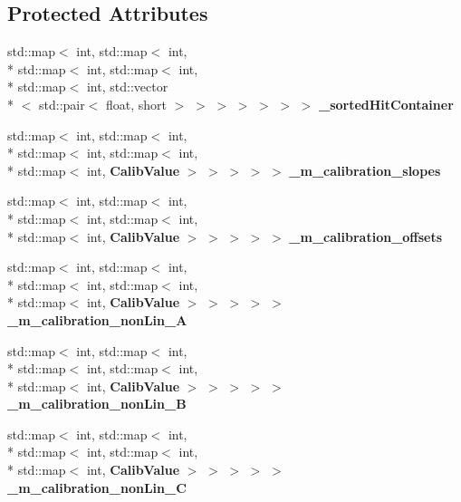 \subsection*{Protected Attributes}
\begin{DoxyCompactItemize}
\item 
std\-::map$<$ int, std\-::map$<$ int, \\*
std\-::map$<$ int, std\-::map$<$ int, \\*
std\-::map$<$ int, std\-::vector\\*
$<$ std\-::pair$<$ float, short $>$ $>$ $>$ $>$ $>$ $>$ $>$ {\bfseries \-\_\-sorted\-Hit\-Container}\label{classCALICE_1_1Ahc2TimeCalibrator_a4ad9a1a2332f58a2c3360f1b445f983b}

\item 
std\-::map$<$ int, std\-::map$<$ int, \\*
std\-::map$<$ int, std\-::map$<$ int, \\*
std\-::map$<$ int, {\bf Calib\-Value} $>$ $>$ $>$ $>$ $>$ {\bfseries \-\_\-m\-\_\-calibration\-\_\-slopes}\label{classCALICE_1_1Ahc2TimeCalibrator_a32d278ad093772556244b07621793fa0}

\item 
std\-::map$<$ int, std\-::map$<$ int, \\*
std\-::map$<$ int, std\-::map$<$ int, \\*
std\-::map$<$ int, {\bf Calib\-Value} $>$ $>$ $>$ $>$ $>$ {\bfseries \-\_\-m\-\_\-calibration\-\_\-offsets}\label{classCALICE_1_1Ahc2TimeCalibrator_a142b706b13a6463b3777ce834866da12}

\item 
std\-::map$<$ int, std\-::map$<$ int, \\*
std\-::map$<$ int, std\-::map$<$ int, \\*
std\-::map$<$ int, {\bf Calib\-Value} $>$ $>$ $>$ $>$ $>$ {\bfseries \-\_\-m\-\_\-calibration\-\_\-non\-Lin\-\_\-\-A}\label{classCALICE_1_1Ahc2TimeCalibrator_a220589cf03693be989b7623ced2c7e9e}

\item 
std\-::map$<$ int, std\-::map$<$ int, \\*
std\-::map$<$ int, std\-::map$<$ int, \\*
std\-::map$<$ int, {\bf Calib\-Value} $>$ $>$ $>$ $>$ $>$ {\bfseries \-\_\-m\-\_\-calibration\-\_\-non\-Lin\-\_\-\-B}\label{classCALICE_1_1Ahc2TimeCalibrator_a9140f56412c2aec3e7124155a051b9a3}

\item 
std\-::map$<$ int, std\-::map$<$ int, \\*
std\-::map$<$ int, std\-::map$<$ int, \\*
std\-::map$<$ int, {\bf Calib\-Value} $>$ $>$ $>$ $>$ $>$ {\bfseries \-\_\-m\-\_\-calibration\-\_\-non\-Lin\-\_\-\-C}\label{classCALICE_1_1Ahc2TimeCalibrator_aa07376af37b1f1a9998c44c530c9be5c}


\end{DoxyCompactItemize}
